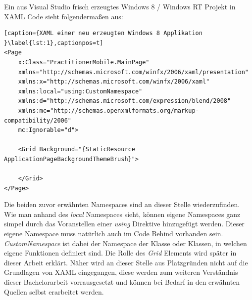 \documentclass[a4paper,bibtotoc,oneside]{scrbook}
\begin{document}
\newline
\newline
Ein aus Visual Studio frisch erzeugtes Windows 8 / Windows RT Projekt in XAML Code sieht folgendermaßen aus:
\begin{lstlisting}[caption={XAML einer neu erzeugten Windows 8 Applikation }\label{lst:1},captionpos=t]
<Page
    x:Class="PractitionerMobile.MainPage"
    xmlns="http://schemas.microsoft.com/winfx/2006/xaml/presentation"
    xmlns:x="http://schemas.microsoft.com/winfx/2006/xaml"
    xmlns:local="using:CustomNamespace"
    xmlns:d="http://schemas.microsoft.com/expression/blend/2008"
    xmlns:mc="http://schemas.openxmlformats.org/markup-compatibility/2006"
    mc:Ignorable="d">

    <Grid Background="{StaticResource ApplicationPageBackgroundThemeBrush}">

    </Grid>
</Page>

\end{lstlisting}
Die beiden zuvor erwähnten Namespaces sind an dieser Stelle wiederzufinden.
\newline
Wie man anhand des \textit{local} Namespaces sieht, können eigene Namespaces ganz simpel durch das Voranstellen einer \textit{using} Direktive hinzugefügt werden. Dieser eigene Namespace muss natürlich auch im Code Behind vorhanden sein.
\newline
\textit{CustomNamespace} ist dabei der Namespace der Klasse oder Klassen, in welchen eigene Funktionen definiert sind. Die Rolle des \textit{Grid} Elements wird später in dieser Arbeit erklärt.
\newline
\newline
Näher wird an dieser Stelle aus Platzgründen nicht auf die Grundlagen von XAML eingegangen, diese werden zum weiteren Verständnis dieser Bachelorarbeit vorrausgesetzt und können bei Bedarf in den erwähnten Quellen selbst erarbeitet werden.
\end{document}
